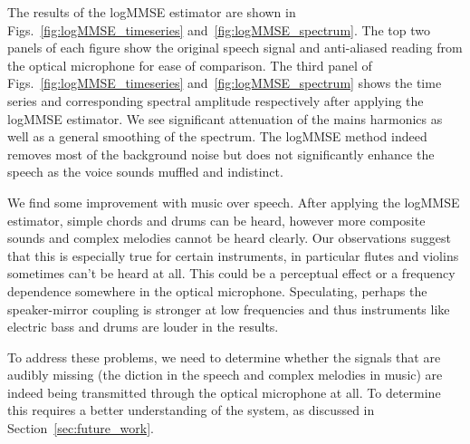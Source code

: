\documentclass[paper-main.tex]{subfiles}
\begin{document}
 



The results of the logMMSE estimator are shown in Figs.~\ref{fig:logMMSE_timeseries} and~\ref{fig:logMMSE_spectrum}. The top two panels of each figure show the original speech signal and anti-aliased reading from the optical microphone for ease of comparison. The third panel of Figs.~\ref{fig:logMMSE_timeseries} and~\ref{fig:logMMSE_spectrum} shows the time series and corresponding spectral amplitude respectively after applying the logMMSE estimator. We see significant attenuation of the mains harmonics as well as a general smoothing of the spectrum. The logMMSE method indeed removes most of the background noise but does not significantly enhance the speech as the voice sounds muffled and indistinct.


We find some improvement with music over speech. After applying the logMMSE estimator, simple chords and drums can be heard, however more composite sounds and complex melodies cannot be heard clearly. 
Our observations suggest that this is especially true for certain instruments, in particular flutes and violins sometimes can’t be heard at all. 
This could be a perceptual effect or a frequency dependence somewhere in the optical microphone.
Speculating, perhaps the speaker-mirror coupling is stronger at low frequencies and thus instruments like electric bass and drums are louder in the results.


To address these problems, we need to determine whether the signals that are audibly missing (the diction in the speech and complex melodies in music) are indeed being transmitted through the optical microphone at all. 
To determine this requires a better understanding of the system, as discussed in Section~\ref{sec:future_work}.
\end{document}
